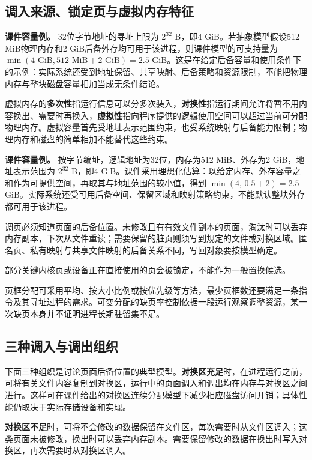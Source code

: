 \subsection{调入来源、锁定页与虚拟内存特征}\label{OS03-backing}

\textbf{课件容量例。} 32位字节地址的寻址上限为 \(2^{32}\) B，即4 GiB。若抽象模型假设512 MiB物理内存和2 GiB后备外存均可用于该进程，则课件模型的可支持量为 \(\min(4\text{ GiB},512\text{ MiB}+2\text{ GiB})=2.5\text{ GiB}\)。这是在给定后备容量和使用条件下的示例：实际系统还受到地址保留、共享映射、后备策略和资源限制，不能把物理内存与整块磁盘容量相加当成无条件结论。

虚拟内存的\textbf{多次性}指运行信息可以分多次装入，\textbf{对换性}指运行期间允许将暂不用内容换出、需要时再换入，\textbf{虚拟性}指向程序提供的逻辑使用空间可以超过当前可分配物理内存。虚拟容量首先受地址表示范围约束，也受系统映射与后备能力限制；物理内存和磁盘的简单相加不能替代这些约束。

\textbf{课件容量例。} 按字节编址，逻辑地址为32位，内存为512 MiB、外存为2 GiB，地址表示范围为 \(2^{32}\) B，即4 GiB。课件采用理想化估算：以给定内存、外存容量之和作为可提供空间，再取其与地址范围的较小值，得到 \(\min(4,\,0.5+2)=2.5\) GiB。实际系统还受可用后备空间、保留区域和映射策略约束，不能默认整块外存都可用于该进程。

调页必须知道页面的后备位置。未修改且有有效文件副本的页面，淘汰时可以丢弃内存副本，下次从文件重读；需要保留的脏页则须写到规定的文件或对换区域。匿名页、私有映射与共享文件映射的后备关系不同，写回对象要按模型确定。

部分关键内核页或设备正在直接使用的页会被锁定，不能作为一般置换候选。

页框分配可采用平均、按大小比例或按优先级等方法，最少页框数还要满足一条指令及其寻址过程的需求。可变分配的缺页率控制依据一段运行观察调整资源，某一次缺页本身并不证明进程长期驻留集不足。

\subsection{三种调入与调出组织}\label{OS03-backing-course-models}

下面三种组织是讨论页面后备位置的典型模型。\textbf{对换区充足}时，在进程运行之前，可将有关文件内容复制到对换区，运行中的页面调入和调出均在内存与对换区之间进行。这样可在课件给出的对换区连续分配模型下减少相应磁盘访问开销；具体性能仍取决于实际存储设备和实现。

\textbf{对换区不足}时，可将不会修改的数据保留在文件区，每次需要时从文件区调入；这类页面未被修改，换出时可以丢弃内存副本。需要保留修改的数据在换出时写入对换区，再次需要时从对换区调入。

